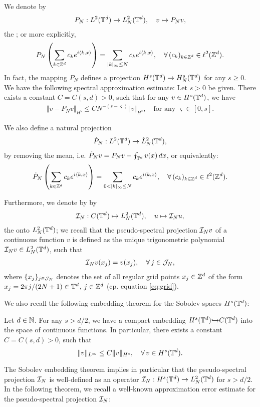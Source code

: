 \documentclass[reqno,a4paper]{amsart}
\begin{document}
We denote by 
\begin{align}\label{eq:proj}
P_N: L^2(\mathbb{T}^d) \to L^2_N(\mathbb{T}^d),
\quad v \mapsto P_Nv,
\end{align}
the ; or more explicitly,
\[
P_N
\left(
\sum_{k\in \mathbb{Z}^d} c_k e^{i\langle k, x\rangle}
\right)
=
\sum_{|k|_\infty \le N} c_k e^{i\langle k, x\rangle},
\quad
\forall \, (c_k)_{k\in \mathbb{Z}^d} \in \ell^2(\mathbb{Z}^d).
\]
In fact, the mapping $P_N$ defines a projection $H^s(\mathbb{T}^d) \to H^s_N(\mathbb{T}^d)$ for any $s\ge 0$. We have the following spectral approximation estimate: Let $s>0$ be given. There exists a constant $C = C(s,d)>0$, such that for any $v\in H^s(\mathbb{T}^d)$, we have
\begin{align}\label{eq:spectral}
\Vert v - P_N v \Vert_{H^\varsigma}
\le C N^{-(s-\varsigma)} \Vert v \Vert_{H^s}, 
\quad
\text{for any $\varsigma \in [0,s]$.}
\end{align}

We also define a natural projection 
\begin{align} \label{eq:dotproj}
\dot{P}_N: L^2(\mathbb{T}^d) \to \dot{L}^2_N(\mathbb{T}^d),
\end{align}
by removing the mean, i.e. $\dot{P}_Nv = P_N v - \fint_{\T^d} v(x) \, dx$, or equivalently:
\[
\dot{P}_N
\left(
\sum_{k\in \mathbb{Z}^d} c_k e^{i\langle k, x\rangle}
\right)
=
\sum_{0 < |k|_\infty \le N} c_k e^{i\langle k, x\rangle},
\quad
\forall \, (c_k)_{k\in \mathbb{Z}^d} \in \ell^2(\mathbb{Z}^d).
\]

Furthermore, we denote by by 
\begin{align} \label{eq:pproj}
\mathcal{I}_N: C(\mathbb{T}^d) \mapsto L^2_N(\mathbb{T}^d),
\quad
u \mapsto \mathcal{I}_Nu,
\end{align}
the  onto $L^2_N(\mathbb{T}^d)$; we recall that the pseudo-spectral projection $\mathcal{I}_Nv$ of a continuous function $v$ is defined as the unique trigonometric polynomial $\mathcal{I}_Nv \in L^2_N(\mathbb{T}^d)$, such that 
\begin{align}
\label{eq:IN}
\mathcal{I}_Nv(x_j) = v(x_j), 
\quad
\forall \, j \in \mathcal{J}_N,
\end{align}
where $\{x_j\}_{j\in \mathcal{J}_N}$ denotes the set of all regular grid points $x_j \in \mathbb{Z}^d$ of the form $x_j = 2\pi j/(2N+1) \in \mathbb{T}^d$, $j\in\mathbb{Z}^d$ (cp. equation \eqref{eq:grid}). 

We also recall the following embedding theorem for the Sobolev spaces $H^s(\mathbb{T}^d)$:
\begin{theorem}  \label{thm:sobolev}
Let $d\in \mathbb{N}$. For any $s> d/2$, we have a compact embedding $H^s(\mathbb{T}^d) {\hookrightarrow} C(\mathbb{T}^d)$ into the space of continuous functions. In particular, there exists a constant $C = C(s,d)>0$, such that
\[
\Vert v \Vert_{L^\infty} \le C \Vert v \Vert_{H^s}, \quad \forall \, v\in H^s(\mathbb{T}^d).
\]
\end{theorem}
The Sobolev embedding theorem implies in particular that the pseudo-spectral projection $\mathcal{I}_N$ is well-defined as an operator $\mathcal{I}_N: H^s(\mathbb{T}^d) \to L^2_N(\mathbb{T}^d)$ for $s>d/2$. In the following theorem, we recall a well-known approximation error estimate for the pseudo-spectral projection $\mathcal{I}_N$:
\end{document}
